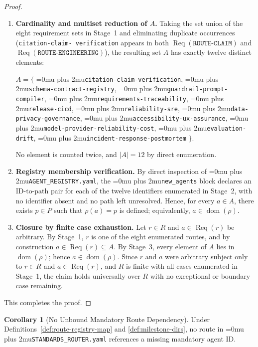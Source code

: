 \documentclass[12pt]{article}
\theoremstyle{definition}
\newtheorem{corollary}[theorem]{Corollary}
\DeclareRobustCommand{\code}[1]{\begingroup\Urlmuskip=0mu plus 2mu\relax\nolinkurl{#1}\endgroup}
\begin{document}
\begin{proof}
\begin{enumerate}
      \item \textbf{Cardinality and multiset reduction of $A$.}
      Taking the set union of the eight requirement sets in Stage~1
      and eliminating duplicate occurrences (\texttt{citation-claim-\allowbreak
      verification} appears in both $\operatorname{Req}(\texttt{ROUTE-CLAIM})$
      and $\operatorname{Req}(\texttt{ROUTE-ENGINEERING})$), the
      resulting set $A$ has exactly twelve distinct elements:
      \begin{sloppypar}
      \noindent
      $A = \{$
      \code{citation-claim-verification},
      \code{schema-contract-registry},
      \code{guardrail-prompt-compiler},
      \code{requirements-traceability},
      \code{release-cicd},
      \code{reliability-sre},
      \code{data-privacy-governance},
      \code{accessibility-ux-assurance},
      \code{model-provider-reliability-cost},
      \code{evaluation-drift},
      \code{incident-response-postmortem}
      $\}$.
      \end{sloppypar}
      No element is counted twice, and $|A| = 12$ by direct
      enumeration.

      \item \textbf{Registry membership verification.}
      By direct inspection of \code{AGENT\_REGISTRY.yaml}, the
      \code{new\_agents} block declares an ID-to-path pair for each
      of the twelve identifiers enumerated in Stage~2, with no
      identifier absent and no path left unresolved. Hence, for every
      $a \in A$, there exists $p \in P$ such that $\rho(a) = p$ is
      defined; equivalently, $a \in \operatorname{dom}(\rho)$.

      \item \textbf{Closure by finite case exhaustion.}
      Let $r \in R$ and $a \in \operatorname{Req}(r)$ be arbitrary.
      By Stage~1, $r$ is one of the eight enumerated routes, and by
      construction $a \in \operatorname{Req}(r) \subseteq A$. By
      Stage~3, every element of $A$ lies in
      $\operatorname{dom}(\rho)$; hence $a \in
      \operatorname{dom}(\rho)$. Since $r$ and $a$ were arbitrary
      subject only to $r \in R$ and $a \in \operatorname{Req}(r)$,
      and $R$ is finite with all cases enumerated in Stage~1, the
      claim holds universally over $R$ with no exceptional or
      boundary case remaining.
\end{enumerate}

This completes the proof.
\end{proof}

\begin{corollary}[No Unbound Mandatory Route Dependency]
\label{cor:unbound-route-dependency}
Under Definitions~\ref{def:route-registry-map} and
\ref{def:milestone-dirs}, no route in
\code{STANDARDS\_ROUTER.yaml} references a missing mandatory agent ID.
\end{corollary}
\end{document}
